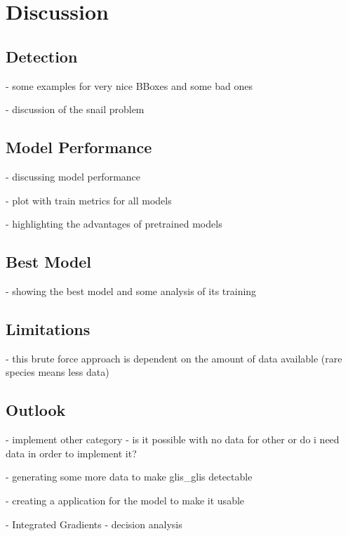 


\section{Discussion}
\label{discussion}

    \subsection{Detection}
    - some examples for very nice BBoxes and some bad ones

    - discussion of the snail problem

    \subsection{Model Performance}
    - discussing model performance

    - plot with train metrics for all models

    - highlighting the advantages of pretrained models

    \subsection{Best Model}
    - showing the best model and some analysis of its training

    \subsection{Limitations}
    - this brute force approach is dependent on the amount of data available (rare species means less data)

    \subsection{Outlook}
    - implement other category - is it possible with no data for other or do i need data in order to implement it?

    - generating some more data to make glis\_glis detectable

    - creating a application for the model to make it usable

    - Integrated Gradients - decision analysis
